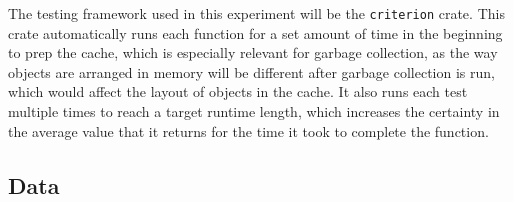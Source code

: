 \documentclass[index]{subfiles}
\begin{document}
The testing framework used in this experiment will be the \verb+criterion+ crate. This crate automatically runs each function for a set amount of time in the beginning to prep the cache\cite{brookheislerAnalysisProcessCriterion}, which is especially relevant for garbage collection, as the way objects are arranged in memory will be different after garbage collection is run, which would affect the layout of objects in the cache. It also runs each test multiple times to reach a target runtime length, which increases the certainty in the average value that it returns for the time it took to complete the function\cite{brookheislerAnalysisProcessCriterion}.

\subsection{Data}
\end{document}

